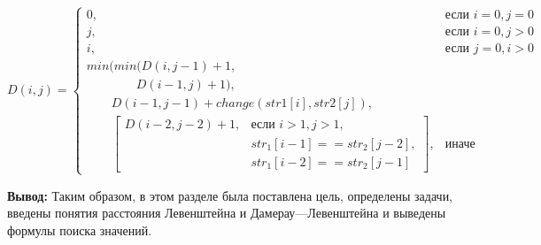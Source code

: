 \begin{footnotesize}
	\begin{equation}
		\label{equation:dam-lev}
		D(i, j) = \begin{cases}
			0, & \textrm{$\mbox{если }i = 0, j = 0$}\\
			j, & \textrm{$\mbox{если }i = 0, j > 0$}\\
			i, & \textrm{$\mbox{если }j = 0, i > 0$}\\
			min(min(D(i, j - 1) + 1, \\
			\qquad\qquad D(i - 1, j) + 1), \\
			\qquad D(i - 1, j - 1) + change(str1[i], str2[j]), \\
			\qquad \left[
			\begin{array}{ccc}
				D(i - 2, j - 2) + 1, & \textrm{$\mbox{если }i > 1, j > 1,$}\\
				& \textrm{$str_{1}[i - 1] == str_{2}[j - 2],$}\\
				& \textrm{$str_{1}[i - 2] == str_{2}[j - 1]$}
			\end{array}
			\right], & \textrm{$\mbox{иначе }$}
		\end{cases}
	\end{equation}
\end{footnotesize}

\textbf{Вывод:}
Таким образом, в этом разделе была поставлена цель, определены задачи, введены понятия расстояния Левенштейна и Дамерау---Левенштейна и выведены формулы поиска значений.
